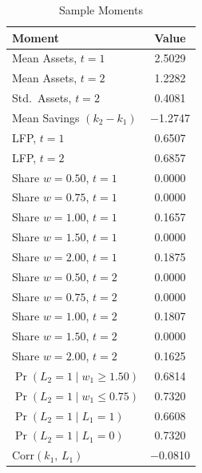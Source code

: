 \begin{table}[htbp]
\centering
\caption{Sample Moments}
\begin{tabular}{lc}
\toprule
Moment & Value \\
\midrule
Mean Assets, $t=1$                         & 2.5029    \\
Mean Assets, $t=2$                         & 1.2282    \\
Std.\ Assets, $t=2$                        & 0.4081    \\
Mean Savings $(k_2 - k_1)$                 & $-$1.2747 \\
LFP, $t=1$                                 & 0.6507    \\
LFP, $t=2$                                 & 0.6857    \\
Share $w=0.50$, $t=1$                      & 0.0000    \\
Share $w=0.75$, $t=1$                      & 0.0000    \\
Share $w=1.00$, $t=1$                      & 0.1657    \\
Share $w=1.50$, $t=1$                      & 0.0000    \\
Share $w=2.00$, $t=1$                      & 0.1875    \\
Share $w=0.50$, $t=2$                      & 0.0000    \\
Share $w=0.75$, $t=2$                      & 0.0000    \\
Share $w=1.00$, $t=2$                      & 0.1807    \\
Share $w=1.50$, $t=2$                      & 0.0000    \\
Share $w=2.00$, $t=2$                      & 0.1625    \\
$\Pr(L_2=1 \mid w_1 \geq 1.50)$            & 0.6814    \\
$\Pr(L_2=1 \mid w_1 \leq 0.75)$            & 0.7320    \\
$\Pr(L_2=1 \mid L_1=1)$                    & 0.6608    \\
$\Pr(L_2=1 \mid L_1=0)$                    & 0.7320    \\
$\mathrm{Corr}(k_1,\, L_1)$               & $-$0.0810 \\
\bottomrule
\end{tabular}
\end{table}
